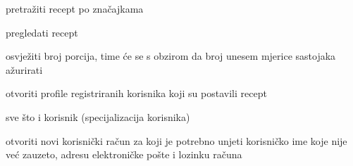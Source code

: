			
			\begin{packed_enum}

				\item  {}
				
				\begin{packed_enum}
					
					\item pretražiti recept po značajkama
					\item pregledati recept
					\item osvježiti broj porcija, time će se s obzirom da broj unesem mjerice sastojaka ažurirati
					\item otvoriti profile registriranih korisnika koji su postavili recept
					
				\end{packed_enum}

				\item  {}
				
				\begin{packed_enum}

					\item sve što i korisnik (specijalizacija korisnika)
					\item otvoriti novi korisnički račun za koji je potrebno unjeti korisničko ime koje nije već zauzeto, adresu elektroničke pošte i lozinku računa
					
				\end{packed_enum}

				\item  {}
				
				\begin{packed_enum}
					

\end{packed_enum}
\end{packed_enum}
